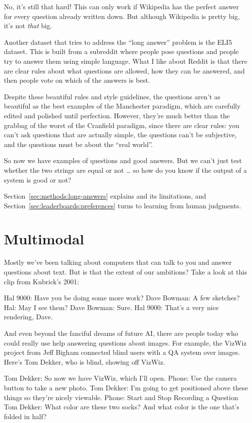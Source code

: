 No, it’s still that hard!  This can only work if Wikipedia has the perfect answer for every question already written down.  But although Wikipedia is pretty big, it’s not \emph{that} big.

Another dataset that tries to address the “long answer” problem is the ELI5 dataset.  This is built from a subreddit where people pose questions and people try to answer them using simple language.  What I like about Reddit is that there are clear rules about what questions are allowed, how they can be answered, and then people vote on which of the answers is best.

Despite these beautiful rules and style guidelines, the questions aren’t as beautiful as the best examples of the Manchester paradigm, which are carefully edited and polished until perfection.  However, they’re much better than the grabbag of the worst of the Cranfield paradigm, since there are clear rules: you can’t ask questions that are actually simple, the questions can’t be subjective, and the questions must be about the “real world”.

So now we have examples of questions and good answers.  But we can’t just test whether the two strings are equal or not … so how do you know if the output of a system is good or not?

Section~\ref{sec:methods:long-answers} explains  and its limitations, and Section~\ref{sec:leaderboards:preferences} turns to learning from human judgments.

\section{Multimodal}
\label{sec:formats:multimodal}

Mostly we’ve been talking about computers that can talk to you and answer questions about text.  But is that the extent of our ambitions?  Take a look at this clip from Kubrick’s 2001:

Hal 9000: Have you be doing some more work?
Dave Bowman: A few sketches?
Hal: May I see them?
Dave Bowman: Sure.
Hal 9000: That’s a very nice rendering, Dave.

And even beyond the fanciful dreams of future AI, there are people today who could really use help answering questions about images.  For example, the VizWiz project from Jeff Bigham connected blind users with a QA system over images.  Here’s Tom Dekker, who is blind, showing off VizWiz.

Tom Dekker: So now we have VizWiz, which I’ll open.
Phone: Use the camera button to take a new photo.
Tom Dekker: I’m going to get positioned above these things so they’re nicely viewable.
Phone: Start and Stop Recording a Question
Tom Dekker: What color are these two socks?  And what color is the one that’s folded in half?

